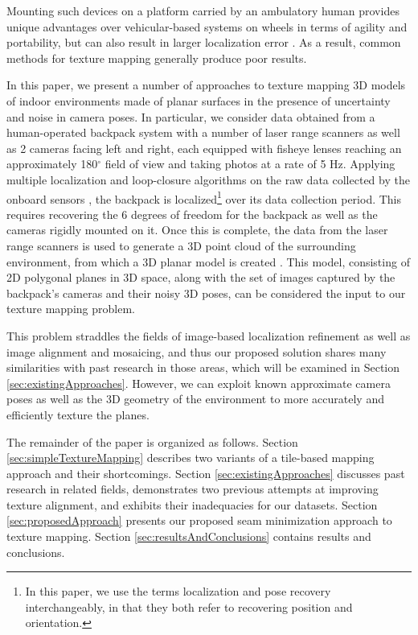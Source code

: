 \documentclass[10pt,twocolumn,letterpaper]{article}
\begin{document}
Mounting such devices on a platform carried by an ambulatory human
provides unique advantages over vehicular-based systems on wheels in
terms of agility and portability, but can also result in larger
localization error \cite{liu2010indoor}. As a result, common methods
for texture mapping generally produce poor results.

In this paper, we present a number of approaches to texture mapping 3D
models of indoor environments made of planar surfaces in the presence
of uncertainty and noise in camera poses. In particular, we consider
data obtained from a human-operated backpack system with a number of
laser range scanners as well as 2 cameras facing left and right, each
equipped with fisheye lenses reaching an approximately 180$^{\circ}$
field of view and taking photos at a rate of 5 Hz. Applying multiple
localization and loop-closure algorithms on the raw data collected by
the onboard sensors \cite{chen2010indoor, kua2012loopclosure,
  liu2010indoor}, the backpack is localized\footnote{In this paper, we
  use the terms localization and pose recovery interchangeably, in
  that they both refer to recovering position and orientation.}  over
its data collection period. This requires recovering the 6 degrees of
freedom for the backpack as well as the cameras rigidly mounted on
it. Once this is complete, the data from the laser range scanners is
used to generate a 3D point cloud of the surrounding environment, from which a
3D planar model is created \cite{sanchez2012point}. This model, consisting of 2D
polygonal planes in 3D space, along with the set of images captured by
the backpack's cameras and their noisy 3D poses, can be considered the
input to our texture mapping problem.

This problem straddles the fields of image-based localization
refinement as well as image alignment and mosaicing, and thus our
proposed solution shares many similarities with past research in those
areas, which will be examined in Section
\ref{sec:existingApproaches}. However, we can exploit known
approximate camera poses as well as the 3D geometry of the environment
to more accurately and efficiently texture the planes.

The remainder of the paper is organized as follows. Section
\ref{sec:simpleTextureMapping} describes two variants of a tile-based
mapping approach and their shortcomings.  Section
\ref{sec:existingApproaches} discusses past research in related
fields, demonstrates two previous attempts at improving texture
alignment, and exhibits their inadequacies for our datasets. Section
\ref{sec:proposedApproach} presents our proposed seam minimization
approach to texture mapping. Section \ref{sec:resultsAndConclusions}
contains results and conclusions.
\end{document}

